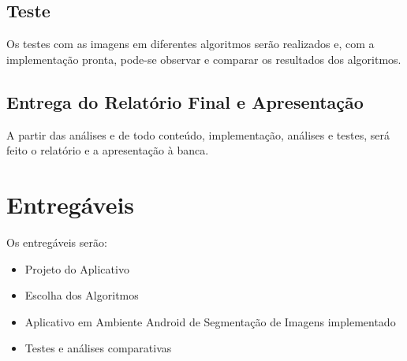 \subsection{Teste}
Os testes com as imagens em diferentes algoritmos serão realizados e, com a implementação pronta, pode-se observar e comparar os resultados dos algoritmos.

\subsection{Entrega do Relatório Final e Apresentação}
A partir das análises e de todo conteúdo, implementação, análises e testes, será feito o relatório e a apresentação à banca.


\section{Entregáveis}
Os entregáveis serão:

\begin{itemize}
\item Projeto do  Aplicativo
\item Escolha dos Algoritmos 
\item Aplicativo em Ambiente Android de Segmentação de Imagens implementado
\item Testes e análises comparativas
\end{itemize}



